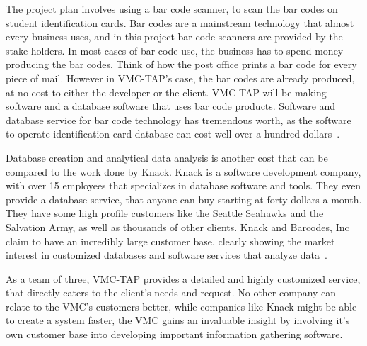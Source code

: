  The project plan involves using a bar code scanner, to scan the bar codes on student identification cards. Bar codes are a mainstream technology that almost every business uses, and in this project bar code scanners are provided by the stake holders. In most cases of bar code use, the business has to spend money producing the bar codes. Think of how the post office prints a bar code for every piece of mail. However in VMC-TAP's case, the bar codes are already produced, at no cost to either the developer or the client.  VMC-TAP will be making software and a database software that uses bar code products. Software and database service for bar code technology has tremendous worth, as the software to operate identification card database can cost well over a hundred dollars~\cite{BARCODES_INC:2}. 


Database creation and analytical data analysis is another cost that can be compared to the work done by Knack. Knack is a software development company, with over 15 employees that specializes in database software and tools. They even provide a database service, that anyone can buy starting at forty dollars a month. They have some high profile customers like the Seattle Seahawks and the Salvation Army, as well as thousands of other clients. Knack and Barcodes, Inc claim to have an incredibly large customer base, clearly showing the market interest in customized databases and software services that analyze data~\cite{KNACK:1}.

As a team of three, VMC-TAP provides a detailed and highly customized service, that directly caters to the client's needs and request. No other company can relate to the VMC's customers better, while companies like Knack might be able to create a system faster, the VMC gains an invaluable insight by involving it's own customer base into developing important information gathering software. 

